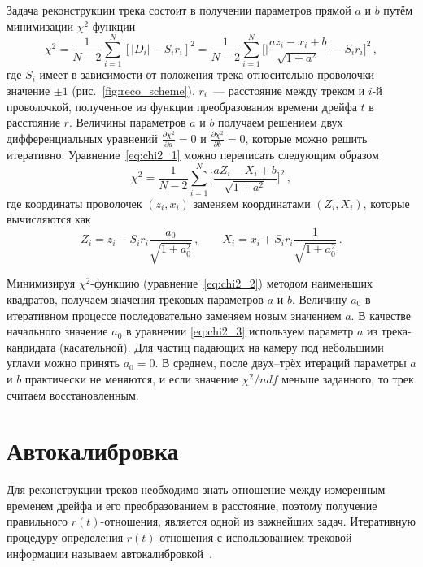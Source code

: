 Задача реконструкции трека состоит в получении параметров прямой $a$ и $b$
путём минимизации $\chi^2$-функции
\begin{equation}
  \label{eq:chi2_1}
  \chi^2 = \frac{1}{N-2}\sum_{i=1}^{N} [|D_i| -S_ir_i]^2 =
  \frac{1}{N-2}\sum_{i=1}^{N} \biggl[
  \Big|\frac{az_i - x_i + b}{\sqrt{1 + a^2}}\Big| - S_ir_i\biggr]^2\,,
\end{equation}
где $S_i$ имеет в зависимости от положения трека относительно проволочки
значение $\pm{1}$ (рис.~\ref{fig:reco_scheme}), $r_i$~--- расстояние между
треком и $i$-й проволочкой, полученное из функции преобразования времени дрейфа
$t$ в расстояние $r$. Величины параметров $a$ и $b$ получаем решением двух
дифференциальных уравнений
$\frac{\partial \chi^2}{\partial a} = 0$ и
$\frac{\partial \chi^2}{\partial b} = 0$, которые можно решить итеративно.
Уравнение~\eqref{eq:chi2_1} можно переписать следующим образом
\begin{equation}
  \label{eq:chi2_2}
  \chi^2 = \frac{1}{N-2}\sum_{i=1}^{N}
  \biggl[\frac{aZ_i - X_i + b}{\sqrt{1 + a^2}}\biggr]^2\,,
\end{equation}
где координаты проволочек $(z_i, x_i)$ заменяем координатами $(Z_i, X_i)$,
которые вычисляются как
\begin{equation}
  \label{eq:chi2_3}
  Z_i = z_i - S_ir_i \frac{a_0}{\sqrt{1 + a_0^2}}\,, \qquad
  X_i = x_i + S_ir_i \frac{1}{\sqrt{1 + a_0^2}}\,.
\end{equation}

Минимизируя $\chi^2$-функцию (уравнение~\eqref{eq:chi2_2}) методом наименьших
квадратов, получаем значения трековых параметров $a$ и $b$. Величину $a_0$ в
итеративном процессе последовательно заменяем новым значением $a$. В качестве
начального значение $a_0$ в уравнении \eqref{eq:chi2_3} используем параметр $a$
из трека-кандидата (касательной). Для частиц падающих на камеру под небольшими
углами можно принять $a_0 = 0$. В среднем, после двух--трёх итераций параметры
$a$ и $b$ практически не меняются, и если значение $\chi^2/ndf$ меньше
заданного, то трек считаем восстановленным.

\section{Автокалибровка}
Для реконструкции треков необходимо знать отношение между измеренным временем
дрейфа и его преобразованием в расстояние, поэтому получение правильного
$r(t)$-отношения, является одной из важнейших задач. Итеративную процедуру
определения $r(t)$-отношения с использованием трековой информации называем
автокалибровкой~\cite{bac97,pet05}.

